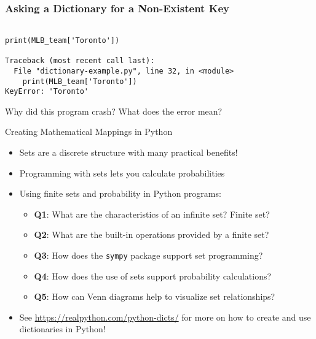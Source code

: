 \documentclass[14pt,aspectratio=169]{beamer}
\begin{document}
%
\begin{frame}[fragile]
  \frametitle{Asking a Dictionary for a Non-Existent Key}
  \begin{minipage}{6in}
    \vspace*{.25in}
    \begin{verbatim}

print(MLB_team['Toronto'])

Traceback (most recent call last):
  File "dictionary-example.py", line 32, in <module>
    print(MLB_team['Toronto'])
KeyError: 'Toronto'

    \end{verbatim}
  \end{minipage}
  \vspace*{.025in}
  \begin{center}
    \normalsize \noindent Why did this program crash? What does the error mean?\\
  \end{center}
\end{frame}

%
\begin{frame}{Creating Mathematical Mappings in Python}
  \begin{itemize}
    \item Sets are a discrete structure with many practical benefits!
      \vspace*{-.2in}
    \item Programming with sets lets you calculate probabilities
      \vspace*{-.2in}
    \item Using finite sets and probability in Python programs:
      \begin{itemize}
        \item {\bf Q1}: What are the characteristics of an infinite set? Finite set?
        \item {\bf Q2}: What are the built-in operations provided by a finite set?
        \item {\bf Q3}: How does the {\tt sympy} package support set
          programming?
        \item {\bf Q4}: How does the use of sets support probability
          calculations?
        \item {\bf Q5}: How can Venn diagrams help to visualize set
          relationships?
      \end{itemize}
      \vspace*{-.2in}
    \item See \url{https://realpython.com/python-dicts/} for more on how to
      create and use dictionaries in Python!
  \end{itemize}
\end{frame}
\end{document}
